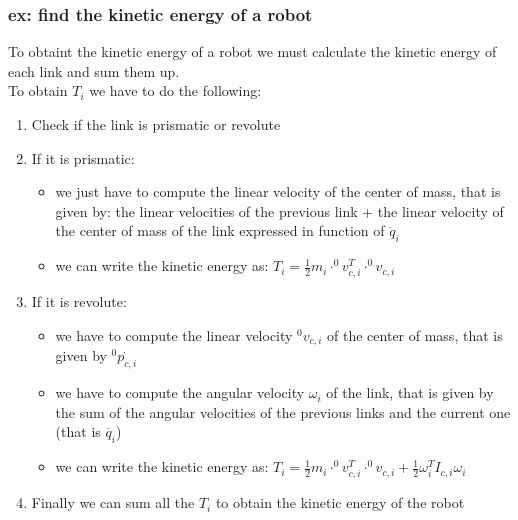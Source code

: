 \documentclass[a4paper,12pt]{article}
\begin{document}
\subsubsection{ex: find the kinetic energy of a robot}
To obtaint the kinetic energy of a robot we must calculate the kinetic 
energy of each link and sum them up.\\
To obtain $T_i$ we have to do the following:
\begin{enumerate}
    \item Check if the link is prismatic or revolute
    \item If it is prismatic: \begin{itemize}
        \item we just have to compute the linear velocity of the center of mass, that is 
        given by: the linear velocities of the previous link + the linear velocity of the
            center of mass of the link expressed in function of $\dot{q}_i$ 
        \item we can write the kinetic energy as: $T_i = \frac{1}{2} m_i \cdot^0v_{c,i}^T\cdot^0v_{c,i}$
    \end{itemize}
    \item If it is revolute: \begin{itemize}
        \item we have to compute the linear velocity $^0v_{c,i}$ of the center of mass, that is 
        given by $^0\dot{p_{c,i}}$
        \item we have to compute the angular velocity $\omega_i$  of the link, that 
        is given by the sum of the angular velocities of the previous 
        links and the current one (that is $\dot{q_i}$)
        \item we can write the kinetic energy as: $T_i = \frac{1}{2} m_i \cdot^0v_{c,i}^T\cdot^0v_{c,i} + \frac{1}{2} \omega_i^T I_{c,i} \omega_i$
    \end{itemize}
        \item Finally we can sum all the $T_i$ to obtain the kinetic energy of the robot
    \end{enumerate}
\end{document}
